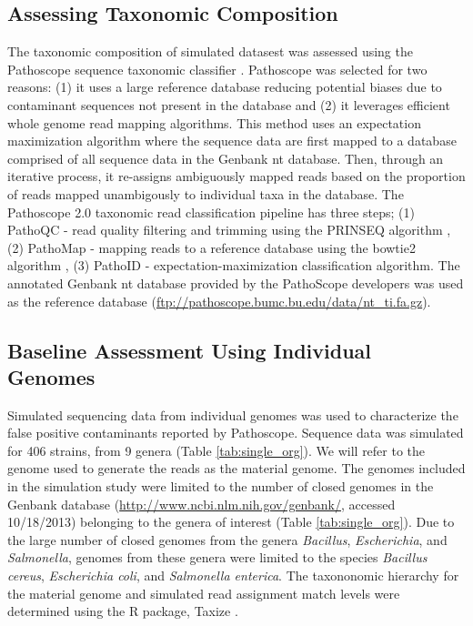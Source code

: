 \documentclass[fleqn,10pt,lineno]{wlpeerj}\usepackage[]{graphicx}\usepackage[]{color}
\begin{document}
\subsection*{Assessing Taxonomic Composition}
The taxonomic composition of simulated datasest was assessed using the Pathoscope sequence taxonomic classifier \citep{Francis2013}.
Pathoscope was selected for two reasons: (1) it uses a large reference database reducing potential biases due to contaminant sequences not present in the database and (2) it leverages efficient whole genome read mapping algorithms.
This method uses an expectation maximization algorithm where the sequence data are first mapped to a database comprised of all sequence data in the Genbank nt database.
Then, through an iterative process, it re-assigns ambiguously mapped reads based on the proportion of reads mapped unambigously to individual taxa in the database.
The Pathoscope 2.0 taxonomic read classification pipeline has three steps; (1) PathoQC - read quality filtering and trimming using the PRINSEQ algorithm \citep{schmieder2011quality}, (2) PathoMap - mapping reads to a reference database using the bowtie2 algorithm \citep{Langmead2012}, (3) PathoID - expectation-maximization classification algorithm.
The annotated Genbank nt database provided by the PathoScope developers was used as the reference database (\url{ftp://pathoscope.bumc.bu.edu/data/nt\_ti.fa.gz}).

\subsection*{Baseline Assessment Using Individual Genomes}
Simulated sequencing data from individual genomes was used to characterize the false positive contaminants reported by Pathoscope. 
Sequence data was simulated for 406 strains, from 9 genera (Table \ref{tab:single_org}).
We will refer to the genome used to generate the reads as the material genome.
The genomes included in the simulation study were limited to the number of closed genomes in the Genbank database (\url{http://www.ncbi.nlm.nih.gov/genbank/}, accessed 10/18/2013) belonging to the genera of interest (Table \ref{tab:single_org}).
Due to the large number of closed genomes from the genera \textit{Bacillus}, \textit{Escherichia}, and \textit{Salmonella}, genomes from these genera were limited to the species \textit{Bacillus cereus}, \textit{Escherichia coli}, and \textit{Salmonella enterica}.
The taxononomic hierarchy for the material genome and simulated read assignment match levels were determined using the R package, Taxize \citep{TaxizeArticle,TaxizeManual}.
\end{document}
